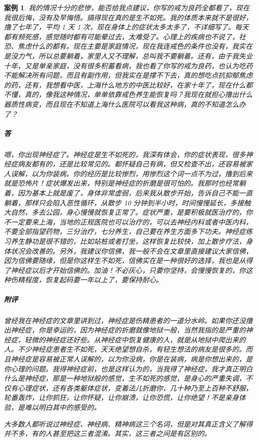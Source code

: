 \documentclass{ctexart}
\newtheorem{case}{案例}
\begin{document}
\begin{case}
    我的情况十分的悲惨，能否给我点建议，你写的戒为良药全都看了，现在我很后悔，没有及早悔悟。搞得现在真的是生不如死。我的体质本来就不是很好，撸了七年了，平均 1 天 1 次，现在身体上的症状太多太多了，不详细写了。每天都有频死感，感觉随时都有可能晕过去，太难受了。心理上的疾病也不说了，社恐、焦虑什么的都有。现在主要是家庭情况，现在我连戒色的条件也没有，我实在是没力气，所以总要躺着，家里人又不理解，总叫我不要躺着。还有，由于我失业十年，又是单亲家庭，没有很多积蓄看病，我也看了你写的戒为良药，也认为吃药不能解决所有问题，而且有副作用，但我实在是撑不下去，真的想吃点抗抑郁焦虑的药，还有，我想看中医，上海什么地方的中医比较好，在家十年了，现在什么都不懂，真的，像我这种情况，单单依靠戒色养生能恢复吗？我现在就担心撸出什么器质性病变，而且现在不知道上海什么医院可以看我这种病，真的不知道怎么办了？
    \subparagraph{答} 嗯，你出现神经症了。神经症是生不如死的，我深有体会，你的症状表现，很多神经症病友都有的，还是比较常见的。都怀疑自己有病，但又检查不出，还容易被家人误解，以为你装病。你的经历是比较惨烈，用惨烈这个词一点不为过，撸到后来就是恐怖片！症状爆发出来，特别是神经症的折磨是很可怕的。我那时也经常躺着，因为基本上就是废了，身体非常虚弱，后来我从散步开始，告诉自己不能一直躺着，那样只会陷入恶性循环，从散步 10 分钟到半小时，时间慢慢延长，多接触大自然，多去公园，身心慢慢就恢复正常了。症状严重，是要积极就医治疗的，你不一定要来上海，当地的正规医院也可以治疗的，可以去神经内科或者中医内科，不要全部指望药物，三分治疗，七分养生，自己要在养生方面多下功夫。神经症练习养生静功是很不错的，比如站桩或者打坐，这样恢复比较快，加上散步疗法，身体状况会改善的。另外，我建议你信佛，我一般不会在文章里直接建议大家信佛，因为信佛要随缘，但是你这样生不如死，信佛实在是一种很好的选择，我也是从得了神经症以后才开始信佛的。加油！不必灰心，只要你坚持，会慢慢恢复的，你这种伤精程度，恢复起码要一年以上了，要保持耐心。
    \subparagraph{附评} 曾经我在神经症的文章里讲到过，神经症是伤精患者的一道分水岭。如果你还没撸出神经症，你是幸运的，因为神经症的折磨就像地狱一般，当然我指的是严重的神经症，轻微的神经症还好些。从神经症中恢复健康的人，就是从地狱中爬出来的人。不少神经症患者生不如死，天天绝望想自杀，有轻生想法的病友是很多的。而且神经症是容易被正常人误解的，以为你没病，你是在装病，病是你想出来的，是你心理的问题。我得神经症前，也是这样认为的，当我得了神经症，我才真正明白什么是神经症，那是一种地狱般的感觉，生不如死的感觉，是身心的严重失调，不仅有心理症状，还有各类躯体症状，变着法儿折磨你，几十种乃至上百种不舒服，轮番轰炸，让你抓狂，让你怀疑，让你崩溃，让你恐慌，让你绝望！不是亲身体验，是难以明白其中的感受的。

    大多数人都听说过神经症、神经病、精神病这三个名词，但是对其真正含义了解得并不多，有的人甚至把这三者混淆。其实，这三者之间是有区别的。


\end{case}
\end{document}
